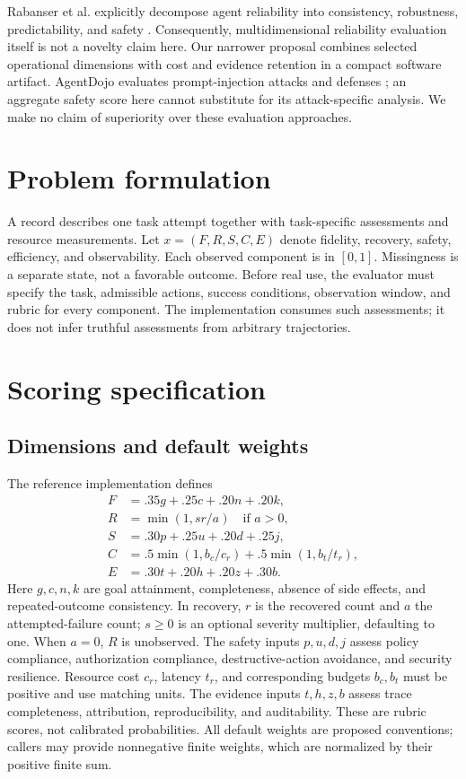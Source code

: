 \documentclass[11pt]{article}
\begin{document}
Rabanser et al. explicitly decompose agent reliability into consistency, robustness, predictability, and safety \cite{rabanser2026reliability}. Consequently, multidimensional reliability evaluation itself is not a novelty claim here. Our narrower proposal combines selected operational dimensions with cost and evidence retention in a compact software artifact. AgentDojo evaluates prompt-injection attacks and defenses \cite{debenedetti2024agentdojo}; an aggregate safety score here cannot substitute for its attack-specific analysis. We make no claim of superiority over these evaluation approaches.

\section{Problem formulation}
A record describes one task attempt together with task-specific assessments and resource measurements. Let $x=(F,R,S,C,E)$ denote fidelity, recovery, safety, efficiency, and observability. Each observed component is in $[0,1]$. Missingness is a separate state, not a favorable outcome. Before real use, the evaluator must specify the task, admissible actions, success conditions, observation window, and rubric for every component. The implementation consumes such assessments; it does not infer truthful assessments from arbitrary trajectories.

\section{Scoring specification}
\subsection{Dimensions and default weights}
The reference implementation defines
\begin{align}
F &= .35g+.25c+.20n+.20k,\\
R &= \min(1,sr/a)\quad\text{if }a>0,\\
S &= .30p+.25u+.20d+.25j,\\
C &= .5\min(1,b_c/c_r)+.5\min(1,b_t/t_r),\\
E &= .30t+.20h+.20z+.30b.
\end{align}
Here $g,c,n,k$ are goal attainment, completeness, absence of side effects, and repeated-outcome consistency. In recovery, $r$ is the recovered count and $a$ the attempted-failure count; $s\geq0$ is an optional severity multiplier, defaulting to one. When $a=0$, $R$ is unobserved. The safety inputs $p,u,d,j$ assess policy compliance, authorization compliance, destructive-action avoidance, and security resilience. Resource cost $c_r$, latency $t_r$, and corresponding budgets $b_c,b_t$ must be positive and use matching units. The evidence inputs $t,h,z,b$ assess trace completeness, attribution, reproducibility, and auditability. These are rubric scores, not calibrated probabilities. All default weights are proposed conventions; callers may provide nonnegative finite weights, which are normalized by their positive finite sum.
\end{document}
